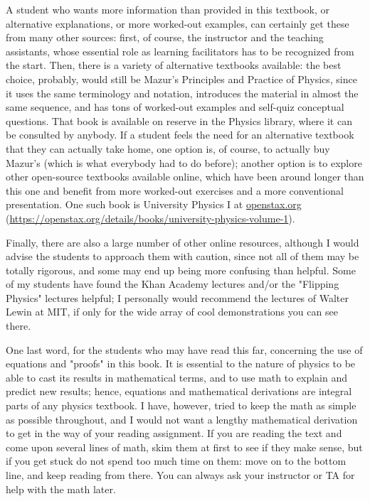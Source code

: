\documentclass[10pt]{article}
\begin{document}
A student who wants more information than provided in this textbook, or alternative explanations, or more worked-out examples, can certainly get these from many other sources: first, of course, the instructor and the teaching assistants, whose essential role as learning facilitators has to be recognized from the start. Then, there is a variety of alternative textbooks available: the best choice, probably, would still be Mazur's Principles and Practice of Physics, since it uses the same terminology and notation, introduces the material in almost the same sequence, and has tons of worked-out examples and self-quiz conceptual questions. That book is available on reserve in the Physics library, where it can be consulted by anybody. If a student feels the need for an alternative textbook that they can actually take home, one option is, of course, to actually buy Mazur's (which is what everybody had to do before); another option is to explore other open-source textbooks available online, which have been around longer than this one and benefit from more worked-out exercises and a more conventional presentation. One such book is University Physics I at \href{http://openstax.org}{openstax.org} (\href{https://openstax.org/details/books/university-physics-volume-1}{https://openstax.org/details/books/university-physics-volume-1}).

Finally, there are also a large number of other online resources, although I would advise the students to approach them with caution, since not all of them may be totally rigorous, and some may end up being more confusing than helpful. Some of my students have found the Khan Academy lectures and/or the "Flipping Physics" lectures helpful; I personally would recommend the lectures of Walter Lewin at MIT, if only for the wide array of cool demonstrations you can see there.

One last word, for the students who may have read this far, concerning the use of equations and "proofs" in this book. It is essential to the nature of physics to be able to cast its results in mathematical terms, and to use math to explain and predict new results; hence, equations and mathematical derivations are integral parts of any physics textbook. I have, however, tried to keep the math as simple as possible throughout, and I would not want a lengthy mathematical derivation to get in the way of your reading assignment. If you are reading the text and come upon several lines of math, skim them at first to see if they make sense, but if you get stuck do not spend too much time on them: move on to the bottom line, and keep reading from there. You can always ask your instructor or TA for help with the math later.
\end{document}
